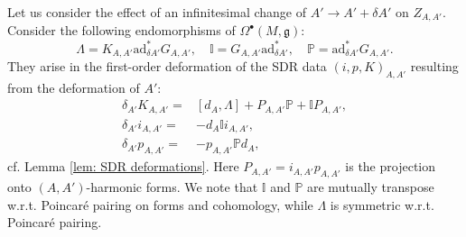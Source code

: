 \documentclass[11pt,a4paper]{amsart}
\theoremstyle{plain} %
\theoremstyle{definition}
\theoremstyle{remark}
\newcommand{\g}{\mathfrak{g}}
\newcommand{\mr}{\mathrm}
\newcommand{\bt}{\bullet}
\newcommand{\ra}{\rightarrow}
\newcommand{\ad}{\mathrm{ad}}
\begin{document}
{Let us consider the effect of an infinitesimal change of $A'\ra A'+\delta A'$ on $Z_{A,A'}$. 
Consider the following endomorphisms of $\Omega^\bt(M,\g)$:
\begin{equation}\label{Lambda, II, PP}
    \Lambda = K_{A,A'} \mr{ad}^*_{\delta A'} G_{A,A'}, \quad
    \mathbb{I} = G_{A,A'} \mr{ad}^*_{\delta A'}, \quad
    \mathbb{P} = \mr{ad}^*_{\delta A'} G_{A,A'}.
\end{equation}
They arise in the first-order deformation of the SDR data $(i,p,K)_{A,A'}$ resulting from the deformation of $A'$:
\begin{equation}\label{variation of ipK in A'}
\begin{aligned}
    \delta_{A'} K_{A,A'}=&[d_A,\Lambda]+P_{A,A'}\mathbb{P} +\mathbb{I} P_{A,A'}, \\
   \delta_{A'} i_{A,A'}  =& -d_A\mathbb{I} i_{A,A'},\\
   \delta_{A'} p_{A,A'}  =& -p_{A,A'}\mathbb{P} d_A,
\end{aligned}
\end{equation}
cf. Lemma \ref{lem: SDR deformations}. 
Here $P_{A,A'}=i_{A,A'}p_{A,A'}$ is the projection onto $(A,A')$-harmonic forms. We note that $\mathbb{I}$ and $\mathbb{P}$ are mutually transpose w.r.t. Poincar\'e pairing on forms and cohomology, while $\Lambda$ is symmetric w.r.t. Poincar\'e pairing.

}
\end{document}
